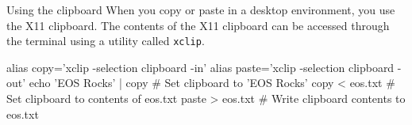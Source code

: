 \begin{block}{Using the clipboard}
  When you copy or paste in a desktop environment, you use the X11 clipboard. The contents of the X11 clipboard can be accessed through the terminal using a utility called \texttt{xclip}.
  \begin{indented}
    \begin{bashcode}
      alias copy='xclip -selection clipboard -in'
      alias paste='xclip -selection clipboard -out'
      echo 'EOS Rocks' | copy # Set clipboard to 'EOS Rocks'
      copy < eos.txt          # Set clipboard to contents of eos.txt
      paste > eos.txt         # Write clipboard contents to eos.txt
    \end{bashcode}
  \end{indented}
\end{block}
